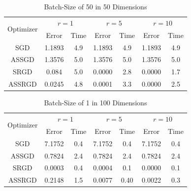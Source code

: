\documentclass[conference,compsoc]{IEEEtran}
\begin{document}
\begin{table}[!t]
\renewcommand{\arraystretch}{1.3}
\caption{Batch-Size of 50 in 50 Dimensions}
\label{tab:d50mb50}
\centering
\begin{tabular}{|c||c|c|c|c|c|c|}
\hline
\multirow{2}{*}{Optimizer} &
    \multicolumn{2}{c}{$r = 1$} &
    \multicolumn{2}{c}{$r = 5$} &
    \multicolumn{2}{c|}{$r = 10$}\\
    & Error & Time & Error & Time & Error & Time \\
    \hline
    SGD & 1.1893 & 4.9 & 1.1893 & 4.9 & 1.1893 & 4.9\\ 
    \hline
    ASSGD & 1.3576 & 5.0 & 1.3576 & 5.0 & 1.3576 & 5.0\\ 
    \hline
    SRGD & 0.084 & 5.0  & 0.0000 & 2.8 & 0.0000 & 1.7\\
    \hline
    ASSRGD & 0.0245 & 4.8 & 0.0001 & 3.3 & 0.0000 & 2.5\\
\hline
\end{tabular}
\end{table}

\begin{table}[!t]
\renewcommand{\arraystretch}{1.3}
\caption{Batch-Size of 1 in 100 Dimensions}
\label{tab:d100mb1}
\centering
\begin{tabular}{|c||c|c|c|c|c|c|}
\hline
\multirow{2}{*}{Optimizer} &
    \multicolumn{2}{c}{$r = 1$} &
    \multicolumn{2}{c}{$r = 5$} &
    \multicolumn{2}{c|}{$r = 10$}\\
    & Error & Time & Error & Time & Error & Time \\
    \hline
    SGD & 7.1752 & 0.4 & 7.1752 & 0.4 & 7.1752 & 0.4\\ 
    \hline
    ASSGD & 0.7824 & 2.4 & 0.7824 & 2.4& 0.7824 & 2.4\\
    \hline
    SRGD & 0.0003 & 0.4 & 0.0004 & 0.1 & 0.0000 & 0.1\\
    \hline
    ASSRGD & 0.2148 & 1.5 & 0.0077 & 0.40 & 0.0022 & 0.3\\
\hline
\end{tabular}
\end{table}
\end{document}
